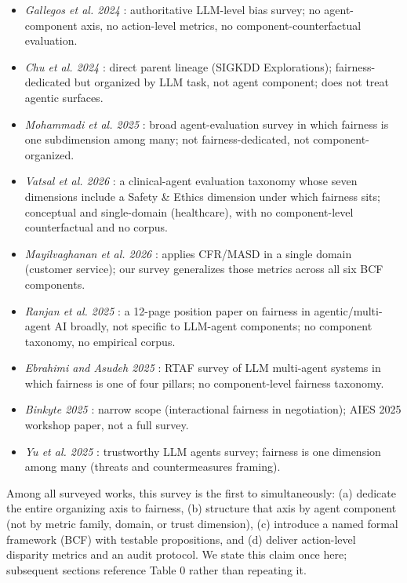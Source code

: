 \documentclass[10pt]{article}
\begin{document}
\begin{itemize}
\item \emph{Gallegos et al. 2024} \cite{gallegos2024bias}: authoritative LLM-level bias survey; no agent-component axis, no action-level metrics, no component-counterfactual evaluation.
\item \emph{Chu et al. 2024} \cite{chu2024fairness}: direct parent lineage (SIGKDD Explorations); fairness-dedicated but organized by LLM task, not agent component; does not treat agentic surfaces.
\item \emph{Mohammadi et al. 2025} \cite{mohammadi2025evaluation}: broad agent-evaluation survey in which fairness is one subdimension among many; not fairness-dedicated, not component-organized.
\item \emph{Vatsal et al. 2026} \cite{vatsal2026agentic}: a clinical-agent evaluation taxonomy whose seven dimensions include a Safety \& Ethics dimension under which fairness sits; conceptual and single-domain (healthcare), with no component-level counterfactual and no corpus.
\item \emph{Mayilvaghanan et al. 2026} \cite{mayilvaghanan2026counterfactual}: applies CFR/MASD in a single domain (customer service); our survey generalizes those metrics across all six BCF components.
\item \emph{Ranjan et al. 2025} \cite{ranjan2025fairness}: a 12-page position paper on fairness in agentic/multi-agent AI broadly, not specific to LLM-agent components; no component taxonomy, no empirical corpus.
\item \emph{Ebrahimi and Asudeh 2025} \cite{ebrahimi2025survey}: RTAF survey of LLM multi-agent systems in which fairness is one of four pillars; no component-level fairness taxonomy.
\item \emph{Binkyte 2025} \cite{binkyte2025interactional}: narrow scope (interactional fairness in negotiation); AIES 2025 workshop paper, not a full survey.
\item \emph{Yu et al. 2025} \cite{yu2025survey}: trustworthy LLM agents survey; fairness is one dimension among many (threats and countermeasures framing).
\end{itemize}

Among all surveyed works, this survey is the first to simultaneously: (a) dedicate the entire organizing axis to fairness, (b) structure that axis by agent component (not by metric family, domain, or trust dimension), (c) introduce a named formal framework (BCF) with testable propositions, and (d) deliver action-level disparity metrics and an audit protocol. We state this claim once here; subsequent sections reference Table 0 rather than repeating it.
\end{document}
